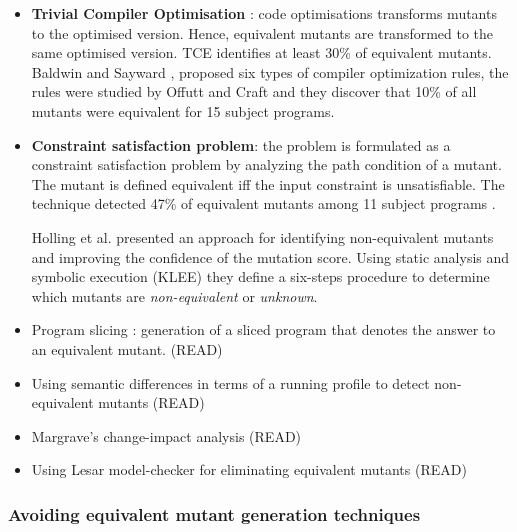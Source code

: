 \begin{itemize}
	\item \textbf{Trivial Compiler Optimisation} \cite{papadakis2015trivial, kintis2017detecting,papadakis2019mutation}: code optimisations transforms mutants to the optimised version. Hence, equivalent mutants are transformed to the same optimised version. TCE identifies at least 30\% of equivalent mutants.
	Baldwin and Sayward \cite{baldwin1979heuristics}, proposed six types of compiler optimization rules, the rules were studied by Offutt and Craft \cite{offutt1994using} and they discover that 10\% of all mutants were equivalent for 15 subject programs.
	
	\item \textbf{Constraint satisfaction problem}: the problem is formulated as a constraint satisfaction problem by analyzing the path condition of a mutant. The mutant is defined equivalent iff the input constraint is unsatisfiable. The technique detected 47\% of equivalent mutants among 11 subject programs \cite{offutt1996detecting,offutt1997automatically}.

	Holling et al. \cite{holling2016nequivack} presented an approach for identifying non-equivalent mutants and improving the confidence of the mutation score. Using static analysis and symbolic execution (KLEE) they define a six-steps procedure to determine which mutants are \textit{non-equivalent} or \textit{unknown}.


	\item Program slicing \cite{voas1997software, hierons1999using, harman2001relationship}: generation of a sliced program that denotes the answer to an equivalent mutant. (READ)
	\item Using semantic differences in terms of a running profile to detect non-equivalent mutants \cite{ellims2007csaw} (READ)
	\item Margrave's change-impact analysis \cite{martin2007fault} (READ)
	\item Using Lesar model-checker for eliminating equivalent mutants \cite{du2008towards} (READ)
\end{itemize}

\subsubsection{Avoiding equivalent mutant generation techniques}

